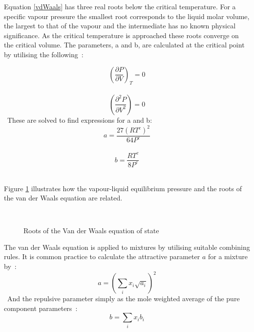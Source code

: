 Equation \ref{vdWaals} has three real roots below the critical temperature. For a specific vapour pressure the smallest root corresponds to the liquid molar volume, the largest to that of the vapour and the intermediate has no known physical significance. As the critical temperature is approached these roots converge on the critical volume. The parameters, a and b, are calculated at the critical point by utilising the following~\cite{ThermophysicalProperties}:\

\begin{equation}
\left( \dfrac{\partial P}{\partial V}\right) _{T}=0 
\end{equation}\
\begin{equation}
\left( \dfrac{\partial^{2}P}{\partial V^{2}}\right) =0
\end{equation}\
These are solved to find expressions for a and b:\
\begin{equation}
a = \dfrac{27 \left( RT^{c} \right) ^{2}}{64P^{c}} \label{Consta}
\end{equation}\
\begin{equation}
b = \dfrac{ RT^{c}}{8P^{c}} \label{Constb}
\end{equation}\


Figure \ref{rootsLit} illustrates how the vapour-liquid equilibrium pressure and the roots of the van der Waals equation are related.\\
				
\begin{figure}[t]
\begin{center}
\resizebox{0.7\textwidth}{!}{}\\
\end{center}
\caption{Roots of the Van der Waals equation of state} \label{rootsLit}
\end{figure}

The van der Waals equation is applied to mixtures by utilising suitable combining rules. It is common practice to calculate the attractive parameter $a$ for a mixture by~\cite{ThermophysicalProperties}:\
\begin{equation}
a = \left(\sum_{i} x_{i} \sqrt{a_{i}}\right)^{2}
\end{equation}\
And the repulsive parameter simply as the mole weighted average of the pure component parameters~\cite{ThermophysicalProperties}:\
\begin{equation}
b = \sum_{i} x_{i}b_{i}
\end{equation}\

